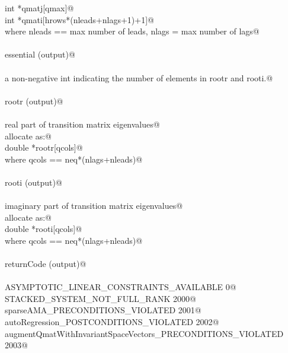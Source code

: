 \documentclass[12pt]{article}
\begin{document}
\begin{flushleft}
\begin{minipage}{\linewidth}
\begin{list}{}{}
\mbox{}\verb@                        int *qmatj[qmax]@\\
\mbox{}\verb@                        int *qmati[hrows*(nleads+nlags+1)+1]@\\
\mbox{}\verb@                where nleads == max number of leads, nlags = max number of lags@\\
\mbox{}\verb@@\\
\mbox{}\verb@        essential (output)@\\
\mbox{}\verb@@\\
\mbox{}\verb@                a non-negative int indicating the number of elements in rootr and rooti.@\\
\mbox{}\verb@@\\
\mbox{}\verb@        rootr (output)@\\
\mbox{}\verb@@\\
\mbox{}\verb@                real part of transition matrix eigenvalues@\\
\mbox{}\verb@                allocate as:@\\
\mbox{}\verb@                        double *rootr[qcols]@\\
\mbox{}\verb@                where qcols == neq*(nlags+nleads)@\\
\mbox{}\verb@@\\
\mbox{}\verb@        rooti (output)@\\
\mbox{}\verb@@\\
\mbox{}\verb@                imaginary part of transition matrix eigenvalues@\\
\mbox{}\verb@                allocate as:@\\
\mbox{}\verb@                        double *rooti[qcols]@\\
\mbox{}\verb@                where qcols == neq*(nlags+nleads)@\\
\mbox{}\verb@@\\
\mbox{}\verb@        returnCode (output)@\\
\mbox{}\verb@@\\
\mbox{}\verb@                ASYMPTOTIC_LINEAR_CONSTRAINTS_AVAILABLE 0@\\
\mbox{}\verb@                STACKED_SYSTEM_NOT_FULL_RANK 2000@\\
\mbox{}\verb@                sparseAMA_PRECONDITIONS_VIOLATED 2001@\\
\mbox{}\verb@                autoRegression_POSTCONDITIONS_VIOLATED 2002@\\
\mbox{}\verb@                augmentQmatWithInvariantSpaceVectors_PRECONDITIONS_VIOLATED 2003@\\

\end{list}
\end{minipage}
\end{flushleft}
\end{document}

